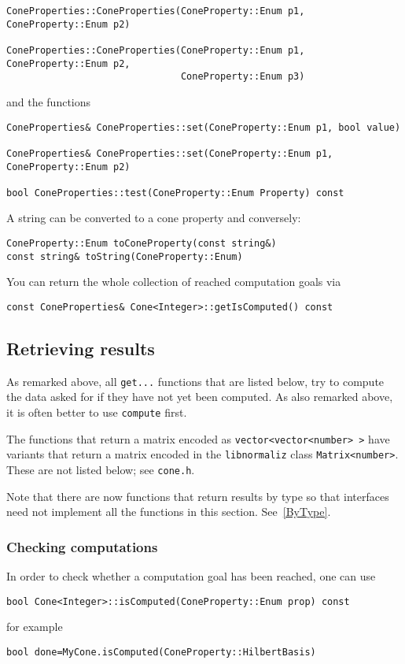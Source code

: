 \begin{small}
\begin{Verbatim}
ConeProperties::ConeProperties(ConeProperty::Enum p1, ConeProperty::Enum p2)

ConeProperties::ConeProperties(ConeProperty::Enum p1, ConeProperty::Enum p2,
                               ConeProperty::Enum p3)
\end{Verbatim}
and the functions
\begin{Verbatim}
ConeProperties& ConeProperties::set(ConeProperty::Enum p1, bool value)

ConeProperties& ConeProperties::set(ConeProperty::Enum p1, ConeProperty::Enum p2)

bool ConeProperties::test(ConeProperty::Enum Property) const
\end{Verbatim}

A string can be converted to a cone property and conversely:
\begin{Verbatim}
ConeProperty::Enum toConeProperty(const string&)
const string& toString(ConeProperty::Enum)
\end{Verbatim}

You can return the whole collection of reached computation goals via
\begin{Verbatim}
const ConeProperties& Cone<Integer>::getIsComputed() const
\end{Verbatim}



\subsection{Retrieving results}

As remarked above, all \verb|get...| functions that are listed below, try to compute the data asked for if they have not yet been computed. As also remarked above, it is often better to use \verb|compute| first.

The functions that return a matrix encoded as \verb|vector<vector<number> >| have variants that return a matrix encoded in the \verb|libnormaliz| class \verb|Matrix<number>|. These are not listed below; see \verb|cone.h|.

Note that there are now functions that return results by type so that interfaces need not implement all the functions in this section. See~\ref{ByType}.

\subsubsection{Checking computations}
In order to check whether a computation goal has been reached, one can use
\begin{Verbatim}
bool Cone<Integer>::isComputed(ConeProperty::Enum prop) const 
\end{Verbatim}
for example
\begin{Verbatim}
bool done=MyCone.isComputed(ConeProperty::HilbertBasis)
\end{Verbatim}


\end{small}
